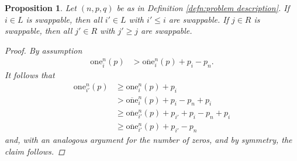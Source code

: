 \documentclass[12pt]{article}
\newtheorem{prop}[thm]{Proposition}
\begin{document}
\begin{prop}
Let $(n, p, q)$ be as in Definition \ref{defn:problem description}. If $i\in L$ is swappable, then all $i'\in L$ with $i'\leq i$ are swappable. If $j\in R$ is swappable, then all $j'\in R$ with $j'\geq j$ are swappable.
\begin{proof}
By assumption
\begin{align*}
\mathrm{one}_i^{n}(p)
&>
\overline{\mathrm{one}}_i^{n}(p)
+
p_i-p_n.
\end{align*}
It follows that
\begin{align*}
\mathrm{one}_{i'}^{n}(p)
&\geq
\mathrm{one}_{i}^{n}(p)
+
p_{i}
\\
&>
\overline{\mathrm{one}}_i^{n}(p)
+
p_i-p_n
+
p_{i}
\\
&\geq
\overline{\mathrm{one}}_{i'}^{n}(p)
+ p_{i'}
+ p_i-p_n
+ p_{i}
\\
&\geq
\overline{\mathrm{one}}_{i'}^{n}(p)
+p_{i'}-p_n
\end{align*}
and, with an analogous argument for the number of zeros, and by symmetry, the claim follows.
\end{proof}
\label{prop:i swappable => i'<i swappable}
\end{prop}
\end{document}
